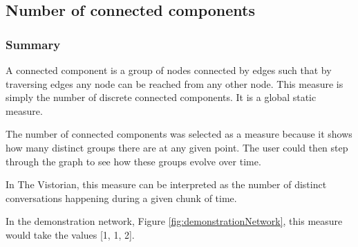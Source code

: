 
\subsection{Number of connected components}
\subsubsection{Summary}
A connected component is a group of nodes connected by edges such that by traversing edges any node can be reached from any other node. This measure is simply the number of discrete connected components. It is a global static measure.

The number of connected components was selected as a measure because it shows how many distinct groups there are at any given point. The user could then step through the graph to see how these groups evolve over time.

In The Vistorian, this measure can be interpreted as the number of distinct conversations happening during a given chunk of time. 

In the demonstration network, Figure \ref{fig:demonstrationNetwork}, this measure would take the values [1, 1, 2]. 


